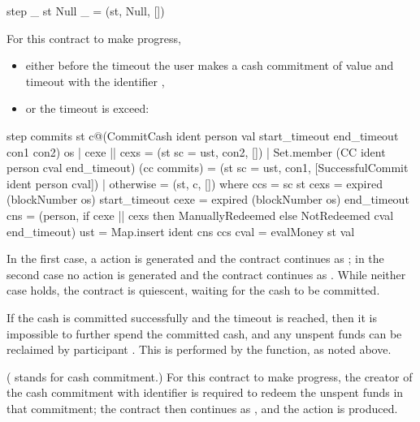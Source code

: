 \documentclass[runningheads]{llncs}
\begin{document}
\begin{haskellcode}
step _ st Null _ = (st, Null, [])
\end{haskellcode}

\smallskip
\noindent
{}  For this contract to make progress,\begin{itemize}
\item either before the timeout  the user  makes a cash commitment of value 
 and timeout   with the identifier , 
\item
or the timeout  is exceed:
\end{itemize} 

\begin{haskellcode}
step 
  commits 
  st 
  c@(CommitCash ident person val start_timeout end_timeout con1 con2) 
  os
  | cexe || cexs = (st {sc = ust}, con2, [])
  | Set.member (CC ident person cval end_timeout) (cc commits)
        = (st {sc = ust}, con1, [SuccessfulCommit ident person cval])
  | otherwise = (st, c, [])
  where ccs = sc st
        cexs = expired (blockNumber os) start_timeout
        cexe = expired (blockNumber os) end_timeout
        cns = (person, if cexe || cexs 
                          then ManuallyRedeemed 
                          else NotRedeemed cval end_timeout)
        ust = Map.insert ident cns ccs
        cval = evalMoney st val
\end{haskellcode}
In the first case, a  action is generated and the contract continues as 
; in the second case no action is generated and the contract continues as 
. While neither case holds, the contract is quiescent, waiting for the cash to be committed. 

If the cash is committed successfully and the timeout  is reached, then it is impossible to further 
spend the committed cash, and any unspent funds can be reclaimed by participant .
 This is performed by the  function, as noted above.

\medskip
\noindent
{} ( stands for cash commitment.) For this contract to make 
progress, the creator of the cash commitment with identifier  is required to redeem the unspent 
funds in that commitment; the contract then continues as , and the action 
 is produced. 
\end{document}
